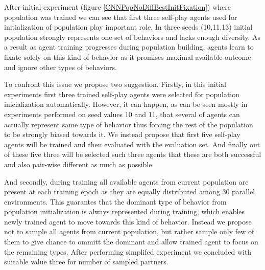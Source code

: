 After initial experiment (figure \ref{CNNPopNoDiffBestInitFixation}) where population was trained we can see that first three self-play agents used for initialization of population play important role.
In three seeds (10,11,13) initial population strongly represents one set of behaviors and lacks enough diversity.
As a result as agent training progresses during population building, agents learn to fixate solely on this kind of behavior as it promises maximal available outcome and ignore other types of behaviors.

To confront this issue we propose two suggestion.
Firstly, in this initial experiments first three trained self-play agents were selected for population inicialization automatically.
However, it can happen, as can be seen mostly in experiments performed on seed values 10 and 11, that several of agents can actually represent same type of behavior thus forcing the rest of the population to be strongly biased towards it.
We instead propose that first five self-play agents will be trained and then evaluated with the evaluation set.
And finally out of these five three will be selected such three agents that these are both successful and also pair-wise different as much as possible.

And secondly, during training all available agents from current population are present at each training epoch as they are equally distributed among 30 parallel environments.
This guarantes that the dominant type of behavior from population initialization is always represented during training, which enables newly trained agent to move towards this kind of behavior.
Instead we propose not to sample all agents from current population, but rather sample only few of them to give chance to ommitt the dominant and allow trained agent to focus on the remaining types.
After performing simplifed experiment we concluded with suitable value three for number of sampled partners.  



